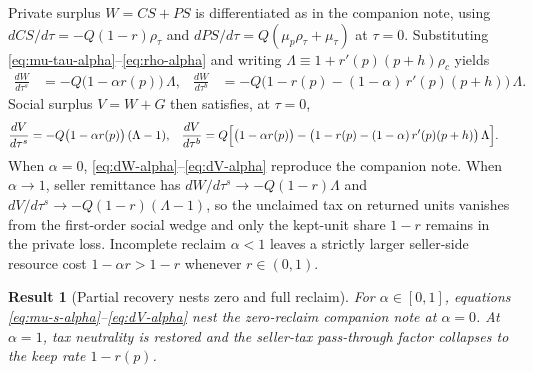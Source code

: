 \documentclass[11pt]{article}
\newtheorem{result}{Result}
\begin{document}
Private surplus $W=CS+PS$ is differentiated as in the companion note, using
$dCS/d\tau=-Q(1-r)\rho_{\tau}$ and
$dPS/d\tau=Q(\mu_p\rho_{\tau}+\mu_{\tau})$ at $\tau=0$.  Substituting
\eqref{eq:mu-tau-alpha}--\eqref{eq:rho-alpha} and writing
$\Lambda\equiv 1+r'(p)(p+h)\rho_c$ yields
\begin{align}
  \frac{dW}{d\tau^{s}}
  &= -Q\bigl(1-\alpha r(p)\bigr)\,\Lambda,
  &
  \frac{dW}{d\tau^{b}}
  &= -Q\bigl(1-r(p)-(1-\alpha)\,r'(p)(p+h)\bigr)\,\Lambda.
  \label{eq:dW-alpha}
\end{align}
Social surplus $V=W+G$ then satisfies, at $\tau=0$,
\begin{align}
  \frac{dV}{d\tau^{s}}
  &= -Q\bigl(1-\alpha r(p)\bigr)\,(\Lambda-1),
  &
  \frac{dV}{d\tau^{b}}
  &= Q\Bigl[
    \bigl(1-\alpha r(p)\bigr)
    -\bigl(1-r(p)-(1-\alpha)\,r'(p)(p+h)\bigr)\,\Lambda
  \Bigr].
  \label{eq:dV-alpha}
\end{align}
When $\alpha=0$, \eqref{eq:dW-alpha}--\eqref{eq:dV-alpha} reproduce the
companion note.  When $\alpha\to 1$, seller remittance has
$dW/d\tau^{s}\to -Q(1-r)\Lambda$ and
$dV/d\tau^{s}\to -Q(1-r)(\Lambda-1)$, so the unclaimed tax on returned units
vanishes from the first-order social wedge and only the kept-unit share
$1-r$ remains in the private loss.  Incomplete reclaim $\alpha<1$ leaves a
strictly larger seller-side resource cost $1-\alpha r>1-r$ whenever $r\in(0,1)$.

\begin{result}[Partial recovery nests zero and full reclaim]
  For $\alpha\in[0,1]$, equations
  \eqref{eq:mu-s-alpha}--\eqref{eq:dV-alpha} nest the zero-reclaim companion
  note at $\alpha=0$.  At $\alpha=1$, tax neutrality is restored and the
  seller-tax pass-through factor collapses to the keep rate $1-r(p)$.
\end{result}
\end{document}
